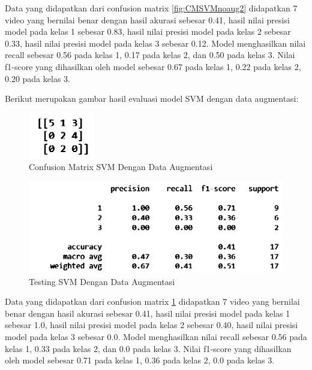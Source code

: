 Data yang didapatkan dari confusion matrix \ref{fig:CMSVMnoaug2} didapatkan 7 video yang bernilai benar
dengan hasil akurasi sebesar 0.41, hasil nilai presisi model pada kelas 1 sebesar 0.83, hasil
nilai presisi model pada kelas 2 sebesar 0.33, hasil nilai presisi model pada kelas 3 sebesar 0.12.
Model menghasilkan nilai recall sebesar 0.56 pada kelas 1, 0.17 pada kelas 2, dan 0.50 pada
kelas 3. Nilai f1-score yang dihasilkan oleh model sebesar 0.67 pada kelas 1, 0.22 pada kelas
2, 0.20 pada kelas 3.

Berikut merupakan gambar hasil evaluasi model SVM dengan data augmentasi:
\newpage
\begin{figure} [ht] \centering
  \includegraphics[scale=2.5]{gambar/CMSVMaug2.png}
  \caption{Confusion Matrix SVM Dengan Data Augmentasi}
  \label{fig:CMSVMaug2}
\end{figure}

\begin{figure} [ht] \centering
  \includegraphics[scale=0.55]{gambar/scoreSVMaug2.png}
  \caption{Testing SVM Dengan Data Augmentasi}
  \label{fig:ScoreSVMaug2}
\end{figure}

Data yang didapatkan dari confusion matrix \ref{fig:CMSVMaug2} didapatkan 7 video yang bernilai benar
dengan hasil akurasi sebesar 0.41, hasil nilai presisi model pada kelas 1 sebesar 1.0, hasil
nilai presisi model pada kelas 2 sebesar 0.40, hasil nilai presisi model pada kelas 3 sebesar 0.0.
Model menghasilkan nilai recall sebesar 0.56 pada kelas 1, 0.33 pada kelas 2, dan 0.0 pada
kelas 3. Nilai f1-score yang dihasilkan oleh model sebesar 0.71 pada kelas 1, 0.36 pada kelas
2, 0.0 pada kelas 3.

